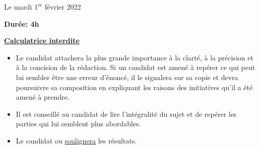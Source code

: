 \documentclass[twoside,french,11pt]{VcCours}
\begin{document}

\begin{center}
\large 
Le mardi $1^{\text{er}}$ février 2022

\bigskip
\textbf{Durée: 4h}

\bigskip
\large\underline{\textbf{Calculatrice interdite}}
\end{center}

\bigskip
\begin{itemize}
  \item Le candidat attachera la plus grande importance à la clarté, à la précision et à la concision de la rédaction. 
  Si un candidat est amené à repérer ce qui peut lui sembler être une erreur d'énoncé, il le signalera sur sa copie et 
  devra poursuivre sa composition en expliquant les raisons des initiatives qu'il a été amené à prendre.
  \item Il est conseillé au candidat de lire l'intégralité du sujet et de repérer les parties qui lui semblent plus abordables.
  \item Le candidat  ou \underline{soulignera} les résultats.
  \end{itemize}
\separationTitre


\newpage
\end{document}
